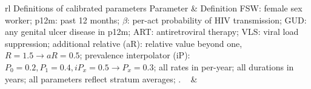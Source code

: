 \begin{longtable}{rl}
  {\label{tab:par.defs}Definitions of calibrated parameters}
  {Parameter & Definition}{%
    FSW: female sex worker;
    p12m: past 12 months;
    $\beta$: per-act probability of HIV transmission;
    GUD: any genital ulcer disease in p12m;
    ART: antiretroviral therapy;
    VLS: viral load suppression;
    additional relative (aR): relative value beyond one, \eg $R = 1.5 \rightarrow aR = 0.5$;
    prevalence interpolator (iP): \eg $P_0 = 0.2, P_1 = 0.4, iP_x = 0.5 \rightarrow P_x = 0.3$;
    all rates in per-year;
    all durations in years;
    all parameters reflect stratum averages;
    .}
    {\small\texttt{\parameter}~\tn{\constr} & \footnotesize{}\\}
\end{longtable}

